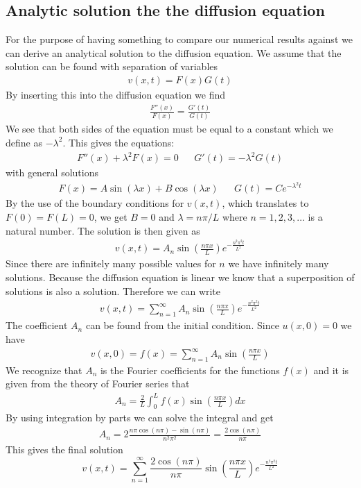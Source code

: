 \documentclass[%
 reprint,
nofootinbib,
aps,
]{revtex4-1}
\begin{document}
\subsection{Analytic solution the the diffusion equation}
For the purpose of having something to compare our numerical results against we can derive an analytical solution to the diffusion equation. We assume that the solution can be found with separation of variables
\begin{align*}
    v(x,t) = F(x)G(t)
\end{align*}
By inserting this into the diffusion equation we find
\begin{align*}
    \frac{F''(x)}{F(x)} = \frac{G'(t)}{G(t)}
\end{align*}
We see that both sides of the equation must be equal to a constant which we define as $-\lambda^2$. This gives the equations:
\begin{align*}
    &F''(x) + \lambda^2F(x) = 0& &G'(t) = -\lambda^2 G(t)&
\end{align*}
with general solutions
\begin{align*}
    &F(x) = A\sin{(\lambda x)} + B\cos{(\lambda x)}& &G(t) = Ce^{-\lambda^2t}&
\end{align*}
By the use of the boundary conditions for $v(x,t)$, which translates to $F(0) = F(L) = 0$, we get $B = 0$ and $\lambda = n\pi/L$ where $n = 1,2,3, \hdots$ is a natural number. The solution is then given as
\begin{align}
    v(x,t) = A_n \sin{(\frac{n\pi x}{L})}e^{-\frac{n^2\pi^2t}{L^2}}
\end{align}
Since there are infinitely many possible values for $n$ we have infinitely many solutions. Because the diffusion equation is linear we know that a superposition of solutions is also a solution. Therefore we can write
\begin{align*}
    v(x,t) = \sum_{n=1}^\infty A_n \sin{(\frac{n\pi x}{L})}e^{-\frac{n^2\pi^2t}{L^2}}
\end{align*}
The coefficient $A_n$ can be found from the initial condition. Since $u(x,0) = 0$ we have
\begin{align*}
    v(x,0) = f(x) =  \sum_{n=1}^\infty A_n \sin{(\frac{n\pi x}{L})}
\end{align*}
We recognize that $A_n$ is the Fourier coefficients for the functions $f(x)$ and it is given from the theory of Fourier series that
\begin{align*}
    A_n = \frac{2}{L}\int_0^L f(x) \sin{(\frac{n\pi x}{L})} dx
\end{align*}
By using integration by parts we can solve the integral and get
\begin{align*}
    A_n = 2\frac{ n\pi \cos{(n\pi)} - \sin{(n\pi)}}{n^2\pi^2} = \frac{2\cos{(n\pi)} }{n\pi}
\end{align*}
This gives the final solution
\begin{equation}
    v(x,t) = \sum_{n=1}^\infty  \frac{2\cos{(n\pi)} }{n\pi} \sin{(\frac{n\pi x}{L})}e^{-\frac{n^2\pi^2t}{L^2}}
    \label{eq:1D_ana}
\end{equation}
\end{document}
